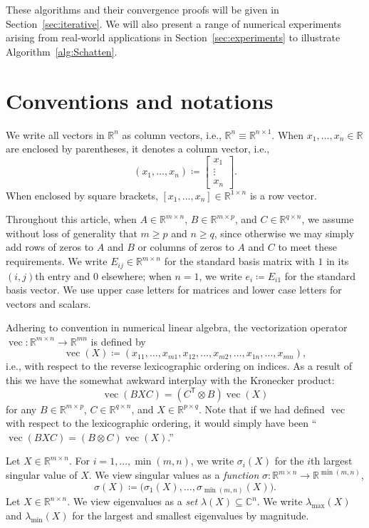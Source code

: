 \documentclass[11pt,reqno]{amsart}
\newcommand{\tp}{{\scriptscriptstyle\mathsf{T}}}
\DeclareMathOperator{\vect}{vec}
\theoremstyle{definition}
\numberwithin{equation}{section}
\newcommand{\C}{\mathbb{C}}
\newcommand{\R}{\mathbb{R}}
\begin{document}
These algorithms and their convergence proofs will be given in Section~\ref{sec:iterative}. We will also present a range of numerical experiments arising from real-world applications in Section~\ref{sec:experiments} to illustrate Algorithm~\ref{alg:Schatten}.

\section{Conventions and notations}

We write all vectors in $\R^n$ as column vectors, i.e., $\R^n \equiv \R^{n \times 1}$. When  $x_1, \dots, x_n \in \R$ are enclosed by parentheses, it denotes a column vector, i.e.,
\[
(x_1,\dots,x_n) \coloneqq \begin{bmatrix}
    x_1 \\
    \vdots \\
    x_n
\end{bmatrix}.
\]
When enclosed by square brackets, $[x_1, \dots, x_n] \in \R^{1 \times n}$ is a row vector. 

Throughout this article, when $ A \in \R^{m \times n}$, $B \in \R^{m \times p}$, and $C \in \R^{q \times n}$, we assume without loss of generality that $m\ge p$ and $n\ge q$, since otherwise we may simply add rows of zeros to $A$ and $B$ or columns of zeros to $A$ and $C$ to meet these requirements. We write  $E_{ij} \in \R^{m \times n}$ for the standard basis matrix with $1$ in its $(i,j)$th entry and $0$ elsewhere; when $n = 1$, we write $e_i \coloneqq E_{i1}$ for the standard basis vector. We use upper case letters for matrices and lower case letters for vectors and scalars.

Adhering to convention in numerical linear algebra, the vectorization operator  $\vect : \R^{m \times n} \to \R^{mn}$ is defined by
\[
\vect(X) \coloneqq (x_{11}, \dots, x_{m1}, x_{12}, \dots, x_{m2}, \dots, x_{1n}, \dots, x_{mn}), 
\]
i.e., with respect to the reverse lexicographic ordering on indices. As a result of this we have the somewhat awkward interplay with the Kronecker product:
\begin{equation}\label{eq:vec}
    \vect(BXC) = (C^\tp \otimes B)\vect(X)
\end{equation}
for any $B \in \R^{m \times p}$, $C \in \R^{q \times n}$, and $X \in \R^{p \times q}$. Note that if we had defined $\vect$ with respect to the lexicographic ordering, it would simply have been ``$\vect(BXC) = (B \otimes C)\vect(X)$.''

Let $X \in \R^{m \times n}$. For $i = 1,\dots,\min(m,n)$, we write $\sigma_i(X)$ for the $i$th largest singular value of $X$. We view singular values as a \emph{function} $\sigma: \R^{m \times n} \to \R^{\min(m,n)}$,
\begin{equation}\label{eq:sing}
\sigma(X) \coloneqq \bigl(\sigma_1(X),\dots , \sigma_{\min(m,n)}(X)\bigr).
\end{equation}
Let $X \in \R^{n \times n}$. We view eigenvalues as a \emph{set} $\lambda(X) \subseteq \C^n$. We write $\lambda_{\max}(X)$ and $\lambda_{\min}(X)$ for the largest and smallest eigenvalues by magnitude.
 
\end{document}
